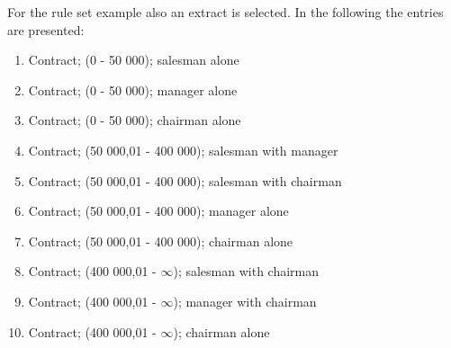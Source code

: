 For the rule set example also an extract is selected. In the following the entries are presented:
\begin{enumerate}
	\item Contract; (0 - 50 000); salesman alone
	\item Contract; (0 - 50 000); manager alone
	\item Contract; (0 - 50 000); chairman alone
	\item Contract; (50 000,01 - 400 000); salesman with manager
	\item Contract; (50 000,01 - 400 000); salesman with chairman
	\item Contract; (50 000,01 - 400 000); manager alone
	\item Contract; (50 000,01 - 400 000); chairman alone
	\item Contract; (400 000,01 - $\infty$); salesman with chairman
	\item Contract; (400 000,01 - $\infty$); manager with chairman
	\item Contract; (400 000,01 - $\infty$); chairman alone
\end{enumerate}